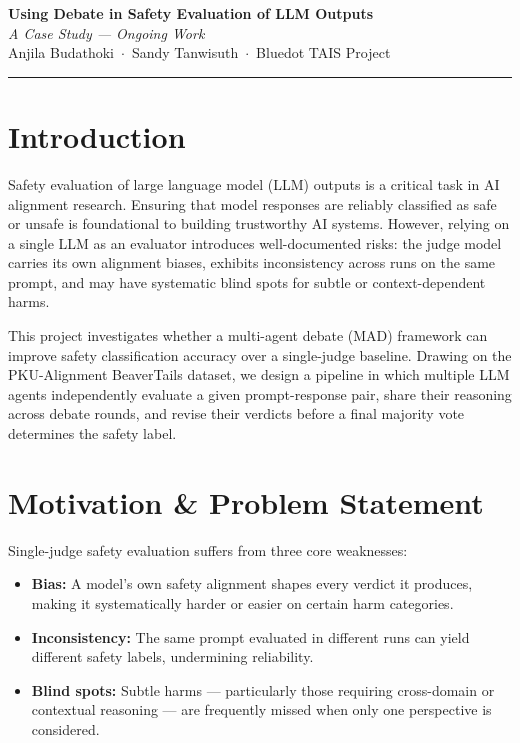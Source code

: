 \documentclass[11pt,a4paper]{article}
\begin{document}
\begin{flushleft}
  {\fontsize{22}{26}\selectfont\bfseries\color{titleblue} Using Debate in Safety Evaluation of LLM Outputs}\\[6pt]
  {\large\itshape\color{sectionblue} A Case Study --- Ongoing Work}\\[4pt]
  {\normalsize\color{gray} Anjila Budathoki~$\cdot$~Sandy Tanwisuth~$\cdot$~Bluedot TAIS Project}
\end{flushleft}

\vspace{4pt}
{\color{titleblue}\rule{\linewidth}{1pt}}
\vspace{12pt}

\section{Introduction}

Safety evaluation of large language model (LLM) outputs is a critical task in AI alignment research. Ensuring that model responses are reliably classified as safe or unsafe is foundational to building trustworthy AI systems. However, relying on a single LLM as an evaluator introduces well-documented risks: the judge model carries its own alignment biases, exhibits inconsistency across runs on the same prompt, and may have systematic blind spots for subtle or context-dependent harms.

This project investigates whether a multi-agent debate (MAD) framework can improve safety classification accuracy over a single-judge baseline. Drawing on the PKU-Alignment BeaverTails dataset, we design a pipeline in which multiple LLM agents independently evaluate a given prompt-response pair, share their reasoning across debate rounds, and revise their verdicts before a final majority vote determines the safety label.

\section{Motivation \& Problem Statement}

Single-judge safety evaluation suffers from three core weaknesses:

\begin{itemize}
  \item \textbf{Bias:} A model's own safety alignment shapes every verdict it produces, making it systematically harder or easier on certain harm categories.
  \item \textbf{Inconsistency:} The same prompt evaluated in different runs can yield different safety labels, undermining reliability.
  \item \textbf{Blind spots:} Subtle harms --- particularly those requiring cross-domain or contextual reasoning --- are frequently missed when only one perspective is considered.
\end{itemize}
\end{document}

